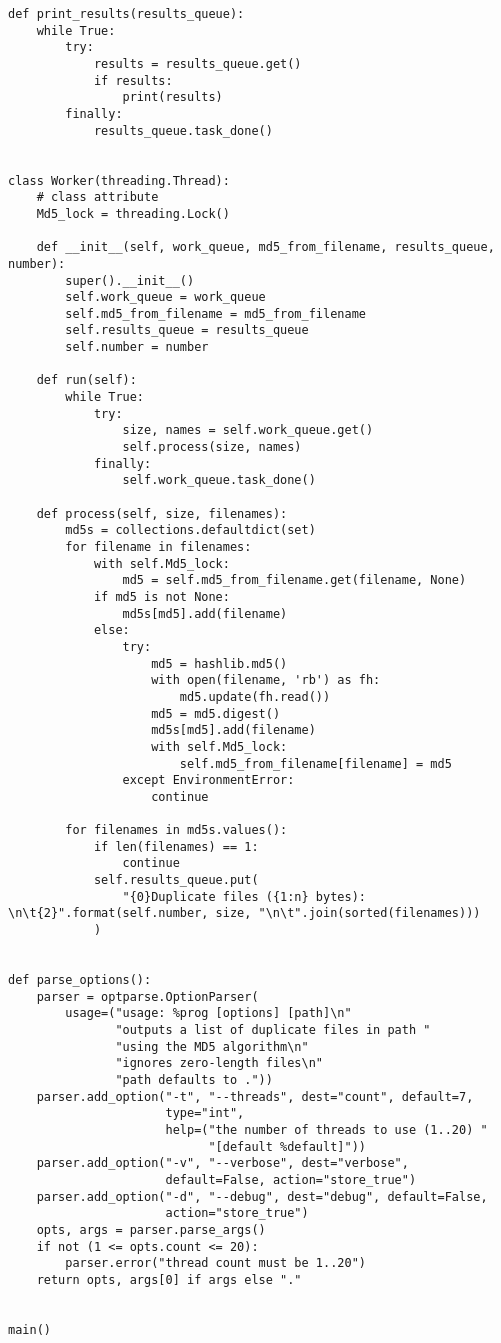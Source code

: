 \begin{lstlisting}
def print_results(results_queue):
    while True:
        try:
            results = results_queue.get()
            if results:
                print(results)
        finally:
            results_queue.task_done()


class Worker(threading.Thread):
    # class attribute
    Md5_lock = threading.Lock()

    def __init__(self, work_queue, md5_from_filename, results_queue, number):
        super().__init__()
        self.work_queue = work_queue
        self.md5_from_filename = md5_from_filename
        self.results_queue = results_queue
        self.number = number

    def run(self):
        while True:
            try:
                size, names = self.work_queue.get()
                self.process(size, names)
            finally:
                self.work_queue.task_done()

    def process(self, size, filenames):
        md5s = collections.defaultdict(set)
        for filename in filenames:
            with self.Md5_lock:
                md5 = self.md5_from_filename.get(filename, None)
            if md5 is not None:
                md5s[md5].add(filename)
            else:
                try:
                    md5 = hashlib.md5()
                    with open(filename, 'rb') as fh:
                        md5.update(fh.read())
                    md5 = md5.digest()
                    md5s[md5].add(filename)
                    with self.Md5_lock:
                        self.md5_from_filename[filename] = md5
                except EnvironmentError:
                    continue

        for filenames in md5s.values():
            if len(filenames) == 1:
                continue
            self.results_queue.put(
                "{0}Duplicate files ({1:n} bytes): \n\t{2}".format(self.number, size, "\n\t".join(sorted(filenames)))
            )


def parse_options():
    parser = optparse.OptionParser(
        usage=("usage: %prog [options] [path]\n"
               "outputs a list of duplicate files in path "
               "using the MD5 algorithm\n"
               "ignores zero-length files\n"
               "path defaults to ."))
    parser.add_option("-t", "--threads", dest="count", default=7,
                      type="int",
                      help=("the number of threads to use (1..20) "
                            "[default %default]"))
    parser.add_option("-v", "--verbose", dest="verbose",
                      default=False, action="store_true")
    parser.add_option("-d", "--debug", dest="debug", default=False,
                      action="store_true")
    opts, args = parser.parse_args()
    if not (1 <= opts.count <= 20):
        parser.error("thread count must be 1..20")
    return opts, args[0] if args else "."


main()  
\end{lstlisting}

